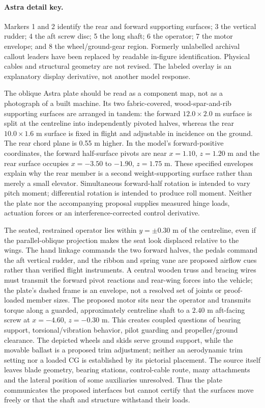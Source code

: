 \documentclass[10pt,letterpaper]{article}
\begin{document}
\paragraph{Astra detail key.}
Markers 1 and 2 identify the rear and forward supporting surfaces;
3 the vertical rudder; 4 the aft screw disc; 5 the long shaft;
6 the operator; 7 the motor envelope; and 8 the wheel/ground-gear region.
Formerly unlabelled archival callout leaders have been replaced by readable
in-figure identification. Physical cables and structural geometry are not
revised. The labeled overlay is an explanatory display derivative, not
another model response.



The oblique Astra plate should be read as a component map, not as a photograph of a built machine. Its two fabric-covered, wood-spar-and-rib supporting surfaces are arranged in tandem: the forward $12.0\times2.0$ m surface is split at the centreline into independently pivoted halves, whereas the rear $10.0\times1.6$ m surface is fixed in flight and adjustable in incidence on the ground. The rear chord plane is 0.55 m higher. In the model's forward-positive coordinates, the forward half-surface pivots are near $x=1.10$, $z=1.20$ m and the rear surface occupies $x=-3.50$ to $-1.90$, $z=1.75$ m. These specified envelopes explain why the rear member is a second weight-supporting surface rather than merely a small elevator. Simultaneous forward-half rotation is intended to vary pitch moment; differential rotation is intended to produce roll moment. Neither the plate nor the accompanying proposal supplies measured hinge loads, actuation forces or an interference-corrected control derivative.

The seated, restrained operator lies within $y=\pm0.30$ m of the centreline, even if the parallel-oblique projection makes the seat look displaced relative to the wings. The hand linkage commands the two forward halves, the pedals command the aft vertical rudder, and the ribbon and spring vane are proposed airflow cues rather than verified flight instruments. A central wooden truss and bracing wires must transmit the forward pivot reactions and rear-wing forces into the vehicle; the plate's dashed frame is an envelope, not a resolved set of joints or proof-loaded member sizes. The proposed motor sits near the operator and transmits torque along a guarded, approximately centreline shaft to a $2.40$ m aft-facing screw at $x=-4.60$, $z=-0.30$ m. This creates coupled questions of bearing support, torsional/vibration behavior, pilot guarding and propeller/ground clearance. The depicted wheels and skids serve ground support, while the movable ballast is a proposed trim adjustment; neither an aerodynamic trim setting nor a loaded CG is established by its pictorial placement. The source itself leaves blade geometry, bearing stations, control-cable route, many attachments and the lateral position of some auxiliaries unresolved. Thus the plate communicates the proposed interfaces but cannot certify that the surfaces move freely or that the shaft and structure withstand their loads.
\end{document}

